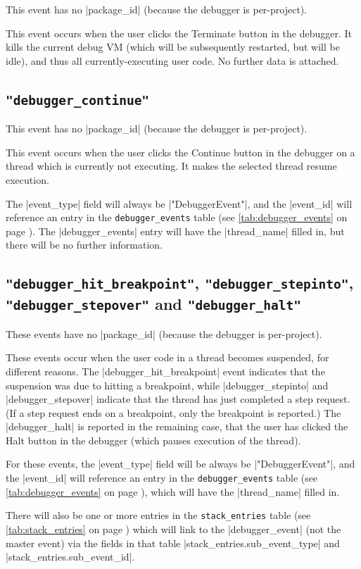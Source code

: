 \documentclass{report}
\newcommand{\myref}[1]{\autoref{#1} on page \pageref*{#1}}
\newcommand{\tabref}[1]{\lstinline|#1| table (see \myref{tab:#1})}
\begin{document}
This event has no |package_id| (because the debugger is per-project).

This event occurs when the user clicks the Terminate button in the debugger.
It kills the current debug VM (which will be subsequently restarted, but will
be idle), and thus all currently-executing user code.  No
further data is attached.

\subsection{\lstinline!"debugger_continue"!}

This event has no |package_id| (because the debugger is per-project).

This event occurs when the user clicks the Continue button in the debugger on
a thread which is currently not executing.
It makes the selected thread resume execution.  

The |event_type| field will always be |"DebuggerEvent"|, and the |event_id| will
reference an entry in the \tabref{debugger_events}.  The |debugger_events|
entry will have the |thread_name| filled in, but there will be no further information.

\subsection{\lstinline!"debugger_hit_breakpoint"!, \lstinline!"debugger_stepinto"!,\\ \lstinline!"debugger_stepover"! and \lstinline!"debugger_halt"!}

These events have no |package_id| (because the debugger is per-project).

These events occur when the user code in a thread becomes suspended, for
different reasons.  The
|debugger_hit_breakpoint| event indicates that the suspension was due to
hitting a breakpoint, while |debugger_stepinto| and |debugger_stepover|
indicate that the thread has just completed a step request.  (If a step
request ends on a breakpoint, only the breakpoint is reported.)  The
|debugger_halt| is reported in the remaining case, that the user has
clicked the Halt button in the debugger (which pauses execution of the thread).

For these events, the |event_type| field will be always be |"DebuggerEvent"|,
and the |event_id| will reference an entry in the \tabref{debugger_events},
which will have the |thread_name| filled in.

There will also be one or more entries in the \tabref{stack_entries} which
will link to the |debugger_event| (not the master event) via the fields in
that table
|stack_entries.sub_event_type| and |stack_entries.sub_event_id|.
\end{document}
